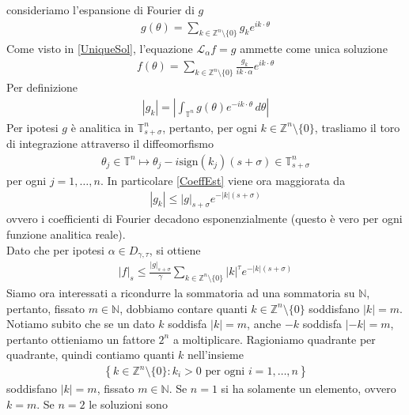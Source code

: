 \documentclass[twoside, 11pt]{amsbook}
\makeatletter
\newcommand{\0}{{(0)}}
\newcommand{\3}{{(3)}}
\theoremstyle{colonplain}
\theoremstyle{colondefinition}
\theoremstyle{colonremark}
\numberwithin{equation}{chapter}
\renewcommand{\proofname}{Dimostrazione}
\renewenvironment{proof}[1][\proofname]{\par
  \pushQED{\qed}%
  \normalfont \topsep6\p@\@plus6\p@\relax
  \trivlist
  \item[\hskip\labelsep\bfseries #1:]\ignorespaces
}{%
  \popQED\endtrivlist\@endpefalse
}
\makeatother
\begin{document}
\begin{proof} consideriamo l'espansione di Fourier di $g$
\begin{align}
    g(\theta) = \sum_{k \in \mathbb{Z}^n\setminus\{0\}} g_k e^{ik \cdot \theta}
\end{align}
Come visto in \eqref{UniqueSol}, l'equazione $\mathcal{L}_\alpha f = g$ ammette come unica soluzione
\begin{align}
    f(\theta) = \sum_{k \in \mathbb{Z}^n\setminus\{0\}} \frac{g_k}{ik \cdot \alpha}e^{ik \cdot \theta}
\end{align}
Per definizione
\begin{align}\label{CoeffEst}
    |g_k| = \left|\int_{\mathbb{T}^n} g(\theta)e^{-ik \cdot \theta} \, d\theta\right|
\end{align}
Per ipotesi $g$ è analitica in $\mathbb{T}^n_{s + \sigma}$, pertanto, per ogni $k \in \mathbb{Z}^n\setminus\{0\}$, trasliamo il toro di integrazione attraverso il diffeomorfismo
\begin{align}
    \theta_j \in \mathbb{T}^n \mapsto \theta_j - i\mathrm{sign}(k_j)(s + \sigma) \in \mathbb{T}^n_{s + \sigma}
\end{align}
per ogni $j = 1, \dots, n$. In particolare \eqref{CoeffEst} viene ora maggiorata da
\begin{align}
    |g_k| \leq |g|_{s + \sigma}e^{-|k|(s + \sigma)}
\end{align}
ovvero i coefficienti di Fourier decadono esponenzialmente (questo è vero per ogni funzione analitica reale). \\
Dato che per ipotesi $\alpha \in D_{\gamma, \tau}$, si ottiene
\begin{align}\label{|f|_s Est}
    |f|_s \leq \frac{|g|_{s + \sigma}}{\gamma}\sum_{k \in \mathbb{Z}^n\setminus\{0\}} |k|^\tau e^{-|k|(s + \sigma)}
\end{align}
Siamo ora interessati a ricondurre la sommatoria ad una sommatoria su $\mathbb{N}$, pertanto, fissato $m \in \mathbb{N}$, dobbiamo contare quanti $k \in \mathbb{Z}^n\setminus\{0\}$ soddisfano $|k| = m$. Notiamo subito che se un dato $k$ soddisfa $|k| = m$, anche $-k$ soddisfa $|-k| = m$, pertanto ottieniamo un fattore $2^n$ a moltiplicare. Ragioniamo quadrante per quadrante, quindi contiamo quanti $k$ nell'insieme
\begin{align}
    \left\{k \in \mathbb{Z}^n\setminus\{0\} : k_i > 0 \text{ per ogni } i = 1, \dots, n\right\}
\end{align}
soddisfano $|k| = m$, fissato $m \in \mathbb{N}$. Se $n = 1$ si ha solamente un elemento, ovvero $k = m$. Se $n = 2$ le soluzioni sono

\end{proof}
\end{document}
